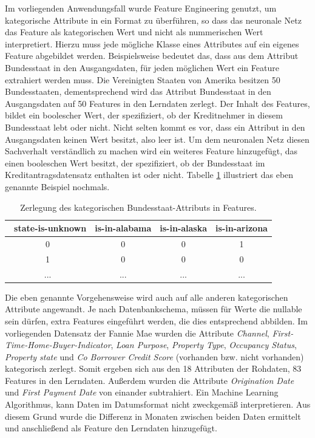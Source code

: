 Im vorliegenden Anwendungsfall wurde Feature Engineering genutzt, um kategorische Attribute in ein Format zu überführen, so dass das neuronale Netz das Feature als kategorischen Wert und nicht als nummerischen Wert interpretiert. Hierzu muss jede mögliche Klasse eines Attributes auf ein eigenes Feature abgebildet werden. Beispielsweise bedeutet das, dass aus dem Attribut Bundesstaat in den Ausgangsdaten, für jeden möglichen Wert ein Feature extrahiert werden muss. Die Vereinigten Staaten von Amerika besitzen 50 Bundesstaaten, dementsprechend wird das Attribut Bundesstaat in den Ausgangsdaten auf 50 Features in den Lerndaten zerlegt. Der Inhalt des Features, bildet ein boolescher Wert, der spezifiziert, ob der Kreditnehmer in diesem Bundesstaat lebt oder nicht. Nicht selten kommt es vor, dass ein Attribut in den Ausgangsdaten keinen Wert besitzt, also leer ist. Um dem neuronalen Netz diesen Sachverhalt verständlich zu machen wird ein weiteres Feature hinzugefügt, das einen booleschen Wert besitzt, der spezifiziert, ob der Bundesstaat im Kreditantragsdatensatz enthalten ist oder nicht. Tabelle  \ref{tab:feature-engine} illustriert das eben genannte Beispiel nochmals.   

\begin{table}[ht]
\centering
\small
\begin{tabular}{cccc}
\toprule
\ state-is-unknown & is-in-alabama & is-in-alaska & is-in-arizona\\\toprule
0 & 0 & 0 & 1\\\midrule
1 & 0 & 0 & 0\\\midrule
... & ... & ... & ...\\\bottomrule
\end{tabular}
\caption{Zerlegung des kategorischen Bundesstaat-Attributs in Features.}
\label{tab:feature-engine}
\end{table}

Die eben genannte Vorgehensweise wird auch auf alle anderen kategorischen Attribute angewandt. Je nach Datenbankschema, müssen für Werte die \glqq nullable\grqq{} sein dürfen, extra Features eingeführt werden, die dies entsprechend abbilden. Im vorliegenden Datensatz der Fannie Mae wurden die Attribute \emph{Channel}, \emph{First-Time-Home-Buyer-Indicator}, \emph{Loan Purpose}, \emph{Property Type}, \emph{Occupancy Status}, \emph{Property state} und \emph{Co Borrower Credit Score} (vorhanden bzw. nicht vorhanden) kategorisch zerlegt. Somit ergeben sich aus den 18 Attributen der Rohdaten, 83 Features in den Lerndaten. Außerdem wurden die Attribute \emph{Origination Date} und \emph{First Payment Date} von einander subtrahiert. Ein Machine Learning Algorithmus, kann Daten im Datumsformat nicht zweckgemäß interpretieren. Aus diesem Grund wurde die Differenz in Monaten zwischen beiden Daten ermittelt und anschließend als Feature den Lerndaten hinzugefügt.   

